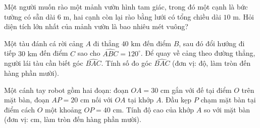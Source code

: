 \begin{bt}%
	Một người muốn rào một mảnh vườn hình tam giác, trong đó một cạnh là bức tường có sẵn dài $6\text{ m}$, hai cạnh còn lại rào bằng lưới có tổng chiều dài $10\text{ m}$. Hỏi diện tích lớn nhất của mảnh vườn là bao nhiêu mét vuông?
\end{bt}

\begin{bt}%
	Một tàu đánh cá rời cảng $A$ đi thẳng $40\text{ km}$ đến điểm $B$, sau đó đổi hướng đi tiếp $30\text{ km}$ đến điểm $C$ sao cho $\widehat{ABC}=120^\circ$. Để quay về cảng theo đường thẳng, người lái tàu cần biết góc $\widehat{BAC}$. Tính số đo góc $\widehat{BAC}$ (đơn vị: độ, làm tròn đến hàng phần mười).
\end{bt}

\begin{bt}%
	Một cánh tay robot gồm hai đoạn: đoạn $OA=30\text{ cm}$ gắn với đế tại điểm $O$ trên mặt bàn, đoạn $AP=20\text{ cm}$ nối với $OA$ tại khớp $A$. Đầu kẹp $P$ chạm mặt bàn tại điểm cách $O$ một khoảng $OP=40\text{ cm}$. Tính độ cao của khớp $A$ so với mặt bàn (đơn vị: cm, làm tròn đến hàng phần mười).
\end{bt}

